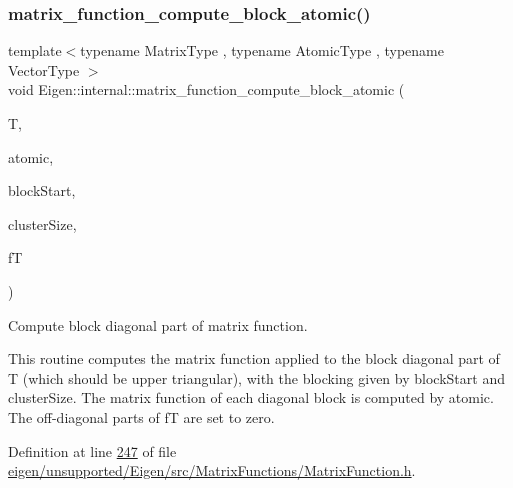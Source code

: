 \mbox{\label{namespace_eigen_1_1internal_a53e617df189868a791e44d2c4e94403f}} 
\subsubsection{\texorpdfstring{matrix\+\_\+function\+\_\+compute\+\_\+block\+\_\+atomic()}{matrix\_function\_compute\_block\_atomic()}}
{\footnotesize\ttfamily template$<$typename Matrix\+Type , typename Atomic\+Type , typename Vector\+Type $>$ \\
void Eigen\+::internal\+::matrix\+\_\+function\+\_\+compute\+\_\+block\+\_\+atomic (\begin{DoxyParamCaption}\item[{const Matrix\+Type \&}]{T,  }\item[{Atomic\+Type \&}]{atomic,  }\item[{const \hyperlink{struct_vector_type}{Vector\+Type} \&}]{block\+Start,  }\item[{const \hyperlink{struct_vector_type}{Vector\+Type} \&}]{cluster\+Size,  }\item[{Matrix\+Type \&}]{fT }\end{DoxyParamCaption})}



Compute block diagonal part of matrix function. 

This routine computes the matrix function applied to the block diagonal part of {\ttfamily T} (which should be upper triangular), with the blocking given by {\ttfamily block\+Start} and {\ttfamily cluster\+Size}. The matrix function of each diagonal block is computed by {\ttfamily atomic}. The off-\/diagonal parts of {\ttfamily fT} are set to zero. 

Definition at line \hyperlink{eigen_2unsupported_2_eigen_2src_2_matrix_functions_2_matrix_function_8h_source_l00247}{247} of file \hyperlink{eigen_2unsupported_2_eigen_2src_2_matrix_functions_2_matrix_function_8h_source}{eigen/unsupported/\+Eigen/src/\+Matrix\+Functions/\+Matrix\+Function.\+h}.

\mbox{\label{namespace_eigen_1_1internal_af9cdbae9f4f166fae876c54b97c0f2bb}} 
